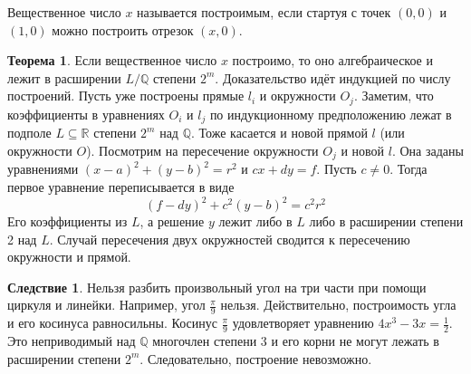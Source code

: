 \documentclass[10pt,a4paper,oneside]{book}
\theoremstyle{definition}
\newtheorem*{defn}{{\color{yellow!30!red} Определение}}
\newtheorem{thm}{{\color{red!40!black} Теорема}}
\newtheorem{cor}{Следствие}
\newcommand{\mb}[1]{\mathbb{#1}}
\def\thrm{\begin{thm}}
\def\ethrm{\end{thm}}
\def\dfn{\begin{defn}}
\def\edfn{\end{defn}}
\def\crl{\begin{cor}}
\def\ecrl{\end{cor}}
\begin{document}
Вещественное число $x$ называется построимым, если стартуя с точек $(0,0)$ и $(1,0)$ можно построить отрезок $(x,0)$. 

\thrm Если вещественное число $x$ построимо, то оно алгебраическое и лежит в расширении $L/\mb Q$ степени $2^m$.
\proof Доказательство идёт индукцией по числу построений. Пусть уже построены прямые $l_i$ и окружности $O_j$. Заметим, что коэффициенты в уравнениях $O_i$ и $l_j$ по индукционному предположению лежат в подполе $L\subseteq \mb R$ степени $2^m$ над $\mb Q$. Тоже касается и новой прямой $l$ (или окружности $O$). Посмотрим на пересечение окружности $O_j$ и новой $l$. Она заданы уравнениями $(x-a)^2+(y-b)^2=r^2$ и $cx+dy=f$. Пусть $c\neq 0$. Тогда первое уравнение переписывается в виде $$(f-dy)^2+c^2(y-b)^2=c^2r^2$$
Его коэффициенты из $L$, а решение $y$ лежит либо в $L$ либо в расширении степени 2 над $L$. Случай пересечения двух окружностей сводится к пересечению окружности и прямой.  
\endproof
\ethrm

\crl
Нельзя разбить произвольный угол на три части при помощи циркуля и линейки.
\proof Например, угол $\frac{\pi}{9}$ нельзя. Действительно, построимость угла и его косинуса равносильны. Косинус $\frac{\pi}{9}$ удовлетворяет уравнению $4x^3-3x=\frac{1}{2}$. Это неприводимый над $\mb Q$ многочлен степени 3 и его корни не могут лежать в расширении степени $2^m$. Следовательно, построение невозможно. 
\endproof
\ecrl

\begin{comment}

\dfn Пусть $K$ -- поле, $f(x)\in K[x]$. Тогда поле $L$ называется полем разложения $f$, если над $L$ многочлен $f$  раскладывается на линейные множители $f(x)=\prod (x-\alpha_i)$ и $L=K[\alpha_1,\dots,\alpha_n]$.
\edfn



\thrm Поле разложения многочлена существует и единственно.
\ethrm
\proof Прежде всего заметим, что мы уже знаем алгоритм построения поля разложения. Действительно. Для этого разложим $f$ на неприводимые множители $f=f_1\dots f_k$ и рассмотрим $L_1=K[\alpha_1]$, где $\alpha_1$ корень $f_1$. Над $L_1$  рассмотрим $f(x)/(x-\alpha_1)$ и построим его поле разложения над $L_1$, которое есть по индукционному предположению. Это и будет искомое $L$. Действительно, многочлен $f$ точно раскладывается над $L$ на линейные множители.  Далее, $L=L_1[\alpha_2,\dots,\alpha_n]$, то есть любой элемент этого поля есть многочлен от $\alpha_i$ с коэффициентами из $L_1$, которые есть многочлены от $\alpha_1$. Осталось раскрыть скобки.
\endproof

\end{comment}
\end{document}
